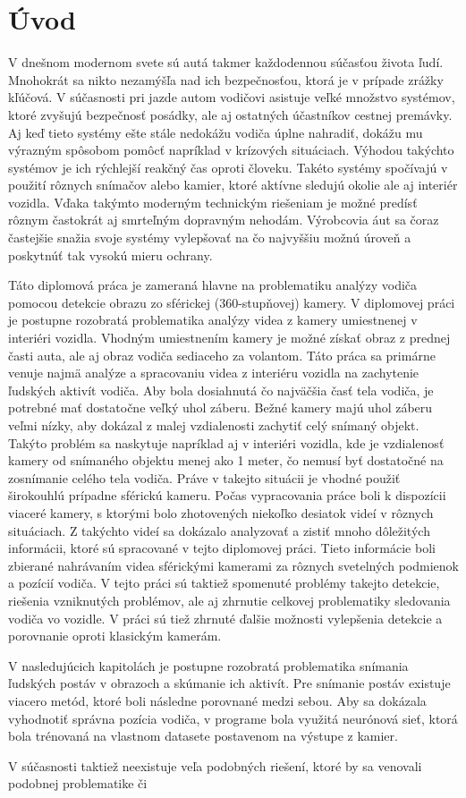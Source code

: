 \documentclass[slovak,master,dept460,male,cpp,cpdeclaration]{diploma}
\begin{document}
\MakeTitlePages

\section{Úvod}
\label{sec:Introduction}
V dnešnom modernom svete sú autá takmer každodennou súčasťou života ľudí. Mnohokrát sa nikto nezamýšľa nad ich bezpečnosťou, ktorá je v prípade zrážky kľúčová. V súčasnosti pri jazde autom vodičovi asistuje veľké množstvo systémov, ktoré zvyšujú bezpečnosť posádky, ale aj ostatných účastníkov cestnej premávky. Aj keď tieto systémy ešte stále nedokážu vodiča úplne nahradiť, dokážu mu výrazným spôsobom pomôcť napríklad v krízových situáciach. Výhodou takýchto systémov je ich rýchlejší reakčný čas oproti človeku. Takéto systémy spočívajú v použití rôznych snímačov alebo kamier, ktoré aktívne sledujú okolie ale aj interiér vozidla. Vďaka takýmto moderným technickým riešeniam je možné predísť rôznym  častokrát aj smrteľným dopravným nehodám. Výrobcovia áut sa čoraz častejšie snažia svoje systémy vylepšovať na čo najvyššiu možnú úroveň a poskytnúť tak vysokú mieru ochrany.\par Táto diplomová práca je zameraná hlavne na problematiku analýzy vodiča pomocou detekcie obrazu zo sférickej (360-stupňovej) kamery. V diplomovej práci je postupne rozobratá problematika analýzy videa z kamery umiestnenej v interiéri vozidla. Vhodným umiestnením kamery je možné získať obraz z prednej časti auta, ale aj obraz vodiča sediaceho za volantom. Táto práca sa primárne venuje najmä analýze a spracovaniu videa z interiéru vozidla na zachytenie ľudských aktivít vodiča. Aby bola dosiahnutá čo najväčšia časť tela vodiča, je potrebné mať dostatočne veľký uhol záberu. Bežné kamery majú uhol záberu veľmi nízky, aby dokázal z malej vzdialenosti zachytiť celý snímaný objekt. Takýto problém sa naskytuje napríklad aj v interiéri vozidla, kde je vzdialenosť kamery od snímaného objektu menej ako 1 meter, čo nemusí byť dostatočné na zosnímanie celého tela vodiča. Práve v takejto situácii je vhodné použiť širokouhlú prípadne sférickú kameru. Počas vypracovania práce boli k dispozícii viaceré kamery, s ktorými bolo zhotovených niekoľko desiatok videí v rôznych situáciach. Z takýchto videí sa dokázalo analyzovať a zistiť mnoho dôležitých informácii, ktoré sú spracované v tejto diplomovej práci. Tieto informácie boli zbierané nahrávaním videa sférickými kamerami za rôznych svetelných  podmienok a pozícií vodiča. V tejto práci sú taktiež spomenuté problémy takejto detekcie, riešenia vzniknutých problémov, ale aj zhrnutie celkovej problematiky sledovania vodiča vo vozidle. V práci sú tiež zhrnuté ďalšie možnosti vylepšenia detekcie a porovnanie oproti klasickým kamerám.\par V nasledujúcich kapitolách je postupne rozobratá problematika snímania ľudských postáv v obrazoch a skúmanie ich aktivít. Pre snímanie postáv existuje viacero metód, ktoré boli následne porovnané medzi sebou. Aby sa dokázala vyhodnotiť správna pozícia vodiča, v programe bola využitá neurónová sieť, ktorá bola trénovaná na vlastnom datasete postavenom na výstupe z kamier.\par V súčasnosti taktiež neexistuje veľa podobných riešení, ktoré by sa venovali podobnej problematike či 
\end{document}
